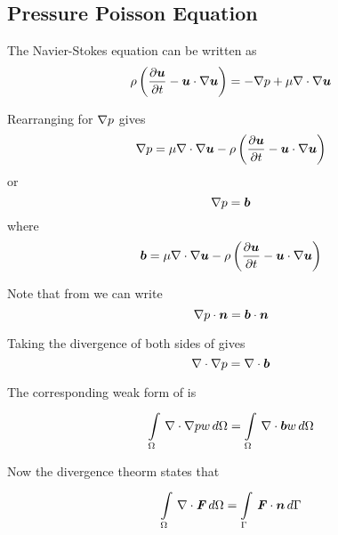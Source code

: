 \subsection{Pressure Poisson Equation}

The Navier-Stokes equation can be written as
\begin{equation}
  \rho\pbrac{\delby{\vectr{u}}{t}-\dotprod{\vectr{u}}{\gradient{}{\vectr{u}}}}=-\gradient{}{p}+\mu\divergence{}{\gradient{}{\vectr{u}}}
  \label{eqn:NavierStokes}
\end{equation}

Rearranging for $\gradient{}{p}$ gives
\begin{equation}
  \gradient{}{p}=\mu\divergence{}{\gradient{}{\vectr{u}}}-\rho\pbrac{\delby{\vectr{u}}{t}-\dotprod{\vectr{u}}{\gradient{}{\vectr{u}}}}  
\end{equation}
or
\begin{equation}
  \gradient{}{p}=\vectr{b}
  \label{eqn:NavierStokesPressureForm}
\end{equation}
where
\begin{equation}
  \vectr{b}=\mu\divergence{}{\gradient{}{\vectr{u}}}-\rho\pbrac{\delby{\vectr{u}}{t}-\dotprod{\vectr{u}}{\gradient{}{\vectr{u}}}}
\end{equation}

Note that from  we can write
\begin{equation} 
  \dotprod{\gradient{}{p}}{\normal}=\dotprod{\vectr{b}}{\normal}
  \label{eqn:NavierStokesPressureFormNormal}
\end{equation}

Taking the divergence of both sides of  gives
\begin{equation}
  \divergence{}{\gradient{}{p}}=\divergence{}{\vectr{b}}
  \label{eqn:PressurePoisson}
\end{equation}

The corresponding weak form of  is
\begin{equation}
  \gint{\Omega}{}{\divergence{}{\gradient{}{p}}w}{\Omega}=\gint{\Omega}{}{\divergence{}{\vectr{b}}w}{\Omega}
  \label{eqn:PressurePoissonWeakForm}
\end{equation}

Now the divergence theorm states that
\begin{equation}
  \gint{\Omega}{}{\divergence{}{\tensor{F}}}{\Omega}=\gint{\Gamma}{}{\dotprod{\tensor{F}}{\normal}}{\Gamma}
  \label{eqn:DivergenceTheorm}
\end{equation}

